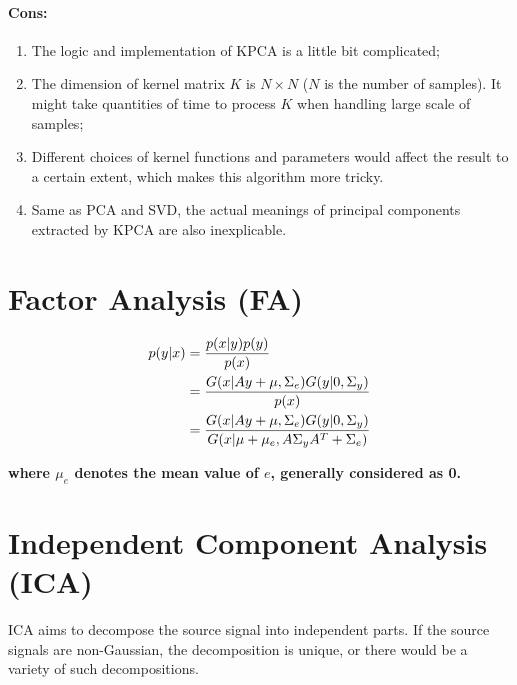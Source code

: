 \documentclass[12pt,a4paper]{article}
\theoremstyle{definition}
\begin{document}
\vspace{-0.03\linewidth}
\paragraph{Cons:}
\begin{enumerate}
	\item The logic and implementation of KPCA is a little bit complicated;
	
	\item The dimension of kernel matrix $K$ is $N \times N$ ($N$ is the number of samples). It might take quantities of time to process $K$ when handling large scale of samples;
	
	\item Different choices of kernel functions and parameters would affect the result to a certain extent, which makes this algorithm more tricky.
	
	\item Same as PCA and SVD, the actual meanings of principal components extracted by KPCA are also inexplicable.
\end{enumerate}

\section{Factor Analysis (FA)}

\vspace{-0.03\linewidth}
\begin{large}
\begin{align*}
	\centering	
	p(y|x) &= \dfrac{p(x|y)p(y)}{p(x)} \\
	&= \dfrac{G(x|Ay+\mu,\Sigma_{e})G(y|0,\Sigma_{y})}{p(x)} \\
	&= \dfrac{G(x|Ay+\mu,\Sigma_{e})G(y|0,\Sigma_{y})}{G(x|\mu+\mu_{e},A\Sigma_{y}A^{T}+\Sigma_{e})}
\end{align*}
\end{large}

\textbf{where $\mu_{e}$ denotes the mean value of $e$, generally considered as 0.}

\section{Independent Component Analysis (ICA)}

ICA aims to decompose the source signal into independent parts. If the source signals are non-Gaussian, the decomposition is unique, or there would be a variety of such decompositions.
\end{document}
